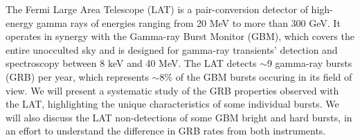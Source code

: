 


\bigskip



\bigskip

\noindent The Fermi Large Area Telescope (LAT) is a pair-conversion detector of high-energy gamma rays of energies ranging from 20 MeV to more than 300 GeV. It operates in synergy with the Gamma-ray Burst Monitor (GBM), which covers the entire unocculted sky and is designed for gamma-ray transients' detection and spectroscopy between 8 keV and 40 MeV. The LAT detects $\sim$9 gamma-ray bursts (GRB) per year, which represents $\sim$8\% of the GBM bursts occuring in its field of view. We will present a systematic study of the GRB properties observed with the LAT, highlighting the unique characteristics of some individual bursts. We will also discuss the LAT non-detections of some GBM bright and hard bursts, in an effort to understand the difference in GRB rates from both instruments.

